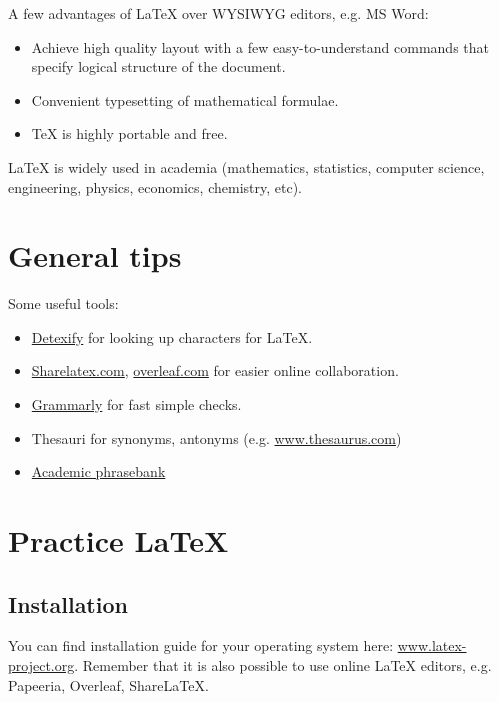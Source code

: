 \documentclass[a4paper, 12pt]{article}
\begin{document}
	
	\vspace{1em}
	A few advantages of \LaTeX{} over WYSIWYG editors, e.g. MS Word:
	
	\begin{itemize}
		\item Achieve high quality layout with a few easy-to-understand commands that specify logical structure of the document.
		\item Convenient typesetting of mathematical formulae.
		\item \TeX{} is highly portable and free.
	\end{itemize}
	
	\LaTeX{} is widely used in academia (mathematics, statistics, computer science, engineering, physics, economics, chemistry, etc).  
	
	\section{General tips}
	
	Some useful tools:
	\begin{itemize}
		\item \href{http://detexify.kirelabs.org/}{Detexify} for looking up characters for \LaTeX.
		\item \href{http://www.sharelatex.com/}{Sharelatex.com}, \href{http://www.overleaf.com/}{overleaf.com} for easier online collaboration.
		\item \href{http://www.grammarly.com/}{Grammarly} for fast simple checks.
		\item Thesauri for synonyms, antonyms (e.g. \href{http://www.thesaurus.com/}{www.thesaurus.com})
		\item \href{http://www.phrasebank.manchester.ac.uk/}{Academic phrasebank} 
	\end{itemize}

	
	\section{Practice \LaTeX}
	\subsection{Installation}
	You can find installation guide for your operating system here: \href{http://www.latex-project.org/get/}{www.latex-project.org}. Remember that it is also possible to use online \LaTeX{} editors, e.g. Papeeria, Overleaf, ShareLaTeX.
	
\end{document}
